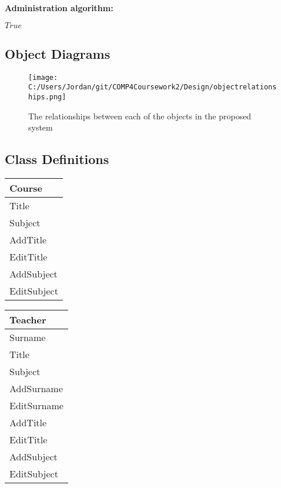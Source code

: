 \textbf{Administration algorithm:}

\begin{algorithm}[H]
\caption{}
\begin{algorithmic}[1]
 {$True$}
	\Else
	\EndIf
\EndWhile
\end{algorithmic}
\end{algorithm}

\subsection{Object Diagrams}

\begin{figure}[H]
    \texttt{[image: C:/Users/Jordan/git/COMP4Coursework2/Design/objectrelationships.png]}
    \caption{The relationships between each of the objects in the proposed system} \label{fig:print_function_result}
\end{figure}

\subsection{Class Definitions}

\begin{center}
\begin{tabular}{|p{5cm}|} \hline
Course \\ \hline
Title \\
Subject \\ \hline
AddTitle \\ 
EditTitle \\
AddSubject \\
EditSubject \\ \hline
\end{tabular}
\end{center}

\begin{center}
\begin{tabular}{|p{5cm}|} \hline
Teacher \\ \hline
Surname \\
Title \\
Subject \\ \hline
AddSurname \\
EditSurname \\
AddTitle \\
EditTitle \\
AddSubject \\
EditSubject \\ \hline
\end{tabular}
\end{center}

